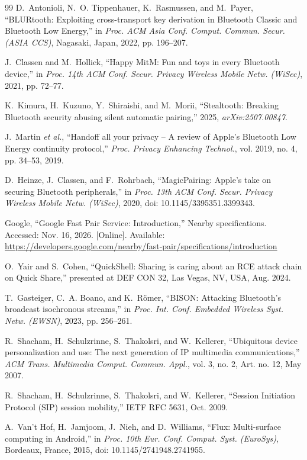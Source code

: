 \documentclass[conference]{IEEEtran}
\begin{document}
\begin{thebibliography}{99}
D.~Antonioli, N.~O. Tippenhauer, K.~Rasmussen, and M.~Payer, ``BLURtooth: Exploiting cross-transport key derivation in Bluetooth Classic and Bluetooth Low Energy,'' in \emph{Proc. ACM Asia Conf. Comput. Commun. Secur. (ASIA CCS)}, Nagasaki, Japan, 2022, pp. 196--207.

J.~Classen and M.~Hollick, ``Happy MitM: Fun and toys in every Bluetooth device,'' in \emph{Proc. 14th ACM Conf. Secur. Privacy Wireless Mobile Netw. (WiSec)}, 2021, pp. 72--77.

K.~Kimura, H.~Kuzuno, Y.~Shiraishi, and M.~Morii, ``Stealtooth: Breaking Bluetooth security abusing silent automatic pairing,'' 2025, \emph{arXiv:2507.00847}.

J.~Martin \emph{et al.}, ``Handoff all your privacy -- A review of Apple's Bluetooth Low Energy continuity protocol,'' \emph{Proc. Privacy Enhancing Technol.}, vol. 2019, no. 4, pp. 34--53, 2019.

D.~Heinze, J.~Classen, and F.~Rohrbach, ``MagicPairing: Apple's take on securing Bluetooth peripherals,'' in \emph{Proc. 13th ACM Conf. Secur. Privacy Wireless Mobile Netw. (WiSec)}, 2020, doi: 10.1145/3395351.3399343.

Google, ``Google Fast Pair Service: Introduction,'' Nearby specifications. Accessed: Nov. 16, 2026. [Online]. Available: \url{https://developers.google.com/nearby/fast-pair/specifications/introduction}

O.~Yair and S.~Cohen, ``QuickShell: Sharing is caring about an RCE attack chain on Quick Share,'' presented at DEF CON 32, Las Vegas, NV, USA, Aug. 2024.

T.~Gasteiger, C.~A. Boano, and K.~R{\"o}mer, ``BISON: Attacking Bluetooth's broadcast isochronous streams,'' in \emph{Proc. Int. Conf. Embedded Wireless Syst. Netw. (EWSN)}, 2023, pp. 256--261.

R.~Shacham, H.~Schulzrinne, S.~Thakolsri, and W.~Kellerer, ``Ubiquitous device personalization and use: The next generation of IP multimedia communications,'' \emph{ACM Trans. Multimedia Comput. Commun. Appl.}, vol. 3, no. 2, Art. no. 12, May 2007.

R.~Shacham, H.~Schulzrinne, S.~Thakolsri, and W.~Kellerer, ``Session Initiation Protocol (SIP) session mobility,'' IETF RFC 5631, Oct. 2009.

A.~Van't Hof, H.~Jamjoom, J.~Nieh, and D.~Williams, ``Flux: Multi-surface computing in Android,'' in \emph{Proc. 10th Eur. Conf. Comput. Syst. (EuroSys)}, Bordeaux, France, 2015, doi: 10.1145/2741948.2741955.


\end{thebibliography}
\end{document}
